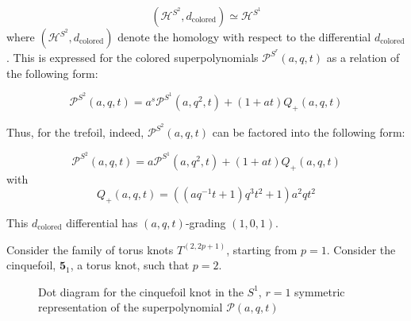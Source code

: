 \documentclass[a4paper,titlepage,twoside]{book}
\begin{document}
\begin{equation}
  ( \mathcal{H}^{  S^2 }, d_{\text{colored}}) \simeq \mathcal{H}^{  S^1 } 
\end{equation}
where $(\mathcal{H}^{  S^2 }, d_{\text{colored}})$ denote the homology with respect to the differential $d_{\text{colored}}$.  This is expressed for the colored superpolynomials $\mathcal{P}^{S^r}{(a,q,t)}$ as a relation of the following form:


\begin{equation}
  \mathcal{P}^{ S^2   }{ (a,q,t) } = a^{s} \mathcal{P}^{ S^1   }{ (a,q^2, t)} + (1+at) Q_+{ (a,q,t)}
\end{equation}


Thus, for the trefoil, indeed, $\mathcal{P}^{S^2}{(a,q,t)}$ can be factored into the following form:



\begin{equation}
  \mathcal{P}^{ S^2   }{ (a,q,t) } = a \mathcal{P}^{ S^1     }{ (a,q^2,t)} + ( 1 + at) Q_+{ (a,q,t)}
\end{equation}
with 
\[
Q_+{(a,q,t)} = {\left( ( aq^{-1} t  + 1 ) q^3 t^2  + 1\right)}  a^{2} q t^{2}
\]

This $d_{\text{colored}}$ differential has $(a,q,t)$-grading $(1,0,1)$.  

Consider the family of torus knots $T^{(2,2p+1)}$, starting from $p=1$.  Consider the cinquefoil, $\mathbf{5}_1$, a torus knot, such that $p=2$.  


\begin{figure}[h]

   \begin{center}    
\end{center}
\caption{Dot diagram for the cinquefoil knot in the $S^1$, $r=1$ symmetric representation of the superpolynomial $\mathcal{P}{  (a,q,t)  }$ } \label{Fig:dotdiagramcinquefoilr01}
\end{figure}
\end{document}
